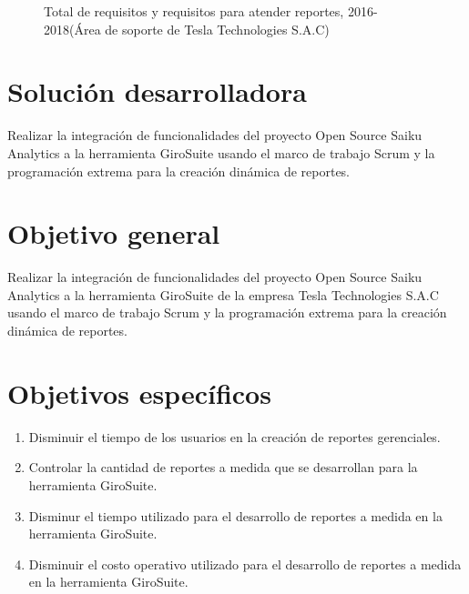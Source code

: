 \begin{spacing}{1.5}
	\begin{figure}[H]
		\begin{center}
			\tikzI
		\end{center}
		\caption {\centering \small{Total de requisitos y requisitos para atender reportes,  2016-2018(\'{A}rea de soporte de Tesla Technologies S.A.C)}} \label{figure:chaperI_1}
	\end{figure}
	
\end{spacing}

\clearpage
\section{Soluci\'{o}n desarrolladora}
\begin{spacing}{1.5}
	Realizar la integraci\'{o}n de funcionalidades del proyecto Open Source Saiku Analytics a la herramienta GiroSuite usando el marco de trabajo Scrum y la programaci\'{o}n extrema para la creaci\'{o}n din\'{a}mica de reportes.
\end{spacing}
\section{Objetivo general}
\begin{spacing}{1.5}
	Realizar la integraci\'{o}n de funcionalidades del proyecto Open Source Saiku Analytics a la herramienta GiroSuite de la empresa Tesla Technologies S.A.C usando el marco de trabajo Scrum y la programaci\'{o}n extrema para la creaci\'{o}n din\'{a}mica de reportes.
\end{spacing}
\section{Objetivos espec\'{i}ficos}
\begin{spacing}{1.5}
	\begin{enumerate}[label=\alph*)]
		\item Disminuir el tiempo de los usuarios en la creaci\'{o}n de reportes gerenciales.
		\item Controlar la cantidad de reportes a medida que se desarrollan para la herramienta GiroSuite.
		\item Disminur el tiempo utilizado para el desarrollo de reportes a medida en la herramienta GiroSuite.
		\item Disminuir el costo operativo utilizado para el desarrollo de reportes a medida en la herramienta GiroSuite.
	\end{enumerate}	
\end{spacing}


	
